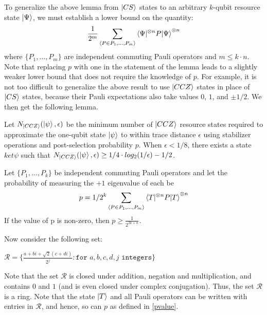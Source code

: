 \documentclass[12pt]{dalthesis}
\begin{document}
To generalize the above lemma from $\ket{CS}$ states to an arbitrary $k$-qubit resource state $\ket{\Psi}$, we must establish a lower bound on the quantity:
\begin{equation}
\frac{1}{2^m} \sum\limits_{\langle P \in P_1, \dots , P_m \rangle} \braket{\Psi|^{\otimes n} P|\Psi}^{\otimes n}
\end{equation}
where $\{ P_1, \dots , P_m \}$ are independent commuting Pauli operators and $m \leq k \cdot n$. Note that replacing $p$ with one in the statement of the lemma leads to a slightly weaker lower bound that does not require the knowledge of $p$. For example, it is not too difficult to generalize the above result to use $\ket{CCZ}$ states in place of $\ket{CS}$ states, because their Pauli expectations also take values $0$, $1$, and $\pm 1/2$. We then get the following lemma.

\begin{lemma}
\label{lemma5.7}
Let $N_{\ket{CCZ}}(\ket{\psi}, \epsilon)$ be the minimum number of $\ket{CCZ}$ resource states required to approximate the one-qubit state $\ket{\psi}$ to within trace distance $\epsilon$ using stabilizer operations and post-selection probability $p$. When $\epsilon < 1/8$, there exists a state $ket{\psi}$ such that $N_{\ket{CCZ}}(\ket{\psi}, \epsilon) \geq 1/4 \cdot log_2(1/\epsilon) - 1/2$. 
\end{lemma}

\begin{proposition}
Let $\{ P_1, \dots , P_k \}$ be independent commuting Pauli operators and let the probability of measuring the $+1$ eigenvalue of each be
\begin{equation}
\label{pvalue}
p = 1/2^k \sum\limits_{\langle P \in P_1, \dots , P_m \rangle}  \braket{T|^{\otimes n} P|T}^{\otimes n}
\end{equation}
If the value of p is non-zero, then $p \geq \frac{1}{2^{2k+n}}$.
\end{proposition}

Now consider the following set:
\begin{center}
$\mathcal{R} = \Big\{ \frac{a+bi+\sqrt{2}(c+di)}{2^j} : \texttt{for } a, b, c, d, j \texttt{ integers} \Big\}$
\end{center}
Note that the set $\mathcal{R}$ is closed under addition, negation and multiplication, and contains $0$ and $1$ (and is even closed under complex conjugation). Thus, the set $\mathcal{R}$ is a ring.
Note that the state $\ket{T}$ and all Pauli operators can be written with entries in $\mathcal{R}$, and hence, so can $p$ as defined in \ref{pvalue}. 
\end{document}

